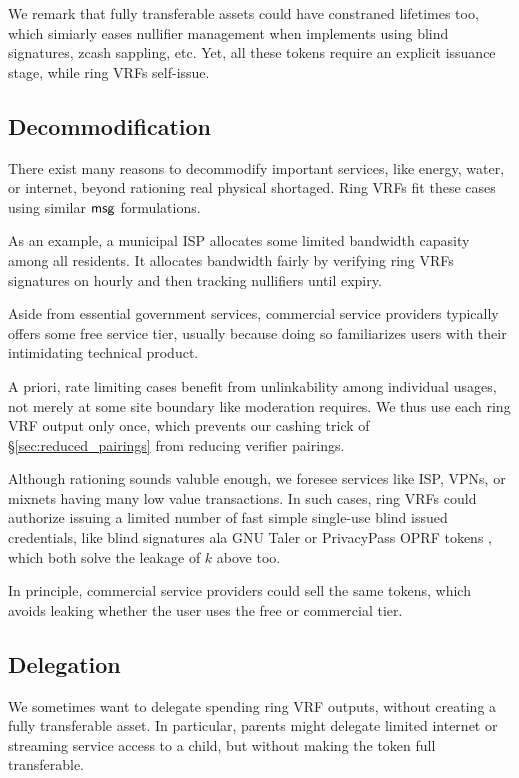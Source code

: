 We remark that fully transferable assets could have constraned lifetimes
too, which simiarly eases nullifier management when implements using
blind signatures, zcash sappling, etc.  Yet, all these tokens require
an explicit issuance stage, while ring VRFs self-issue.


\subsection{Decommodification}

There exist many reasons to decommodify important services,
like energy, water, or internet,
 beyond rationing real physical shortaged.
Ring VRFs fit these cases using similar $\mathsf{msg}$ formulations.

As an example, a municipal ISP allocates some limited bandwidth capasity
among all residents.  It allocates bandwidth fairly by verifying ring VRFs
signatures on hourly \msg and then tracking nullifiers until expiry.

Aside from essential government services, commercial service providers
typically offers some free service tier, usually because doing so
familiarizes users with their intimidating technical product.


A priori, rate limiting cases benefit from unlinkability among individual
usages, not merely at some site boundary like moderation requires.
We thus use each ring VRF output only once, which prevents our cashing
trick of \S\ref{sec:reduced_pairings} from reducing verifier pairings.

Although rationing sounds valuble enough, we foresee services like ISP,
VPNs, or mixnets having many low value transactions.
In such cases, ring VRFs could authorize issuing a limited number of
fast simple single-use blind issued credentials, like blind signatures
ala GNU Taler \cite{taler} or PrivacyPass OPRF tokens \cite{PrivacyPass},
 which both solve the leakage of $k$ above too.

In principle, commercial service providers could sell the same tokens,
which avoids leaking whether the user uses the free or commercial tier.


\subsection{Delegation}

We sometimes want to delegate spending ring VRF outputs, without
creating a fully transferable asset.  In particular, parents might
delegate limited internet or streaming service access to a child,
but without making the token full transferable.

